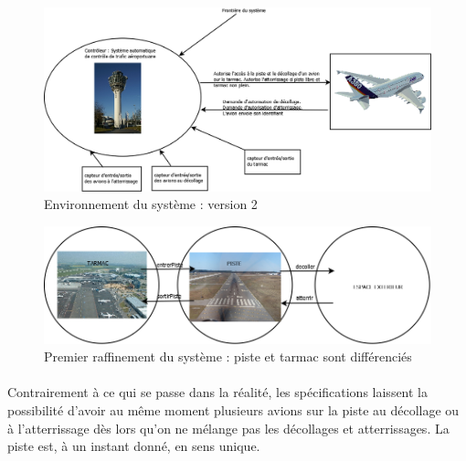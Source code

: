 \begin{figure}[H]
	\begin{center}	
		\includegraphics[scale=0.3]{images/1/env2}
		\caption{Environnement du système : version 2}
		\label{ctx}
	\end{center}
\end{figure}
\begin{figure}[H]
	\begin{center}	
		\includegraphics[scale=0.4]{images/1/raf1}
		\caption{Premier raffinement du système : piste et tarmac sont différenciés}
		\label{raf1}
	\end{center}
\end{figure}
\paragraph{}
Contrairement à ce qui se passe dans la réalité, les spécifications laissent la possibilité d'avoir au même moment plusieurs avions sur la piste au décollage ou à l'atterrissage dès lors qu'on ne mélange pas les décollages et atterrissages.
La piste est, à un instant donné, en sens unique.



